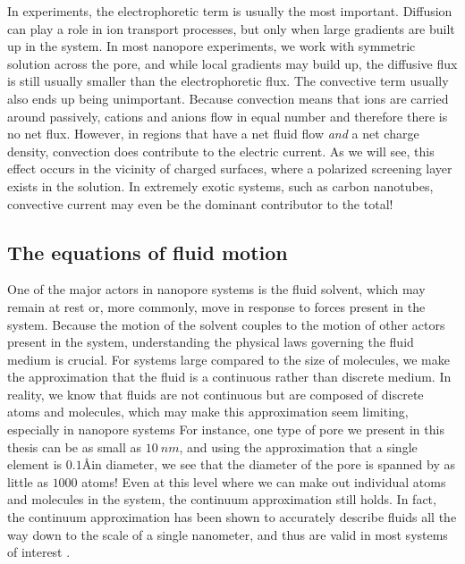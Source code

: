 				In experiments, the electrophoretic term is usually the most important. Diffusion can play a role in ion transport processes, but only when large gradients are built up in the system. In most nanopore experiments, we work with symmetric solution across the pore, and while local gradients may build up, the diffusive flux is still usually smaller than the electrophoretic flux. The convective term usually also ends up being unimportant. Because convection means that ions are carried around passively, cations and anions flow in equal number and therefore there is no net flux. However, in regions that have a net fluid flow \textit{and} a net charge density, convection does contribute to the electric current. As we will see, this effect occurs in the vicinity of charged surfaces, where a polarized screening layer exists in the solution. In extremely exotic systems, such as carbon nanotubes, convective current may even be the dominant contributor to the total!


			
		\subsection{The equations of fluid motion}
		
			One of the major actors in nanopore systems is the fluid solvent, which may remain at rest or, more commonly, move in response to forces present in the system. Because the motion of the solvent couples to the motion of other actors present in the system, understanding the physical laws governing the fluid medium is crucial. For systems large compared to the size of molecules, we make the approximation that the fluid is a continuous rather than discrete medium. In reality, we know that fluids are not continuous but are composed of discrete atoms and molecules, which may make this approximation seem limiting, especially in nanopore systems For instance, one type of pore we present in this thesis can be as small as $\SI{10}{nm}$, and using the approximation that a single element is $0.1$\AA in diameter, we see that the diameter of the pore is spanned by as little as $1000$ atoms! Even at this level where we can make out individual atoms and molecules in the system, the continuum approximation still holds. In fact, the continuum approximation has been shown to accurately describe fluids all the way down to the scale of a single nanometer, and thus are valid in most systems of interest \cite{Bocquet2010}. 
			
			
			
